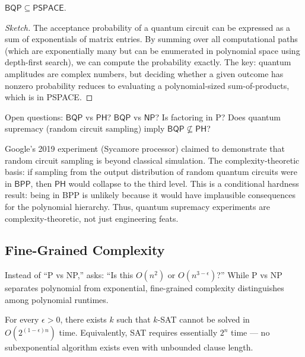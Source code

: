 \begin{theorem}
$\mathsf{BQP} \subseteq \mathsf{PSPACE}$.
\end{theorem}

\begin{proof}[Sketch]
The acceptance probability of a quantum circuit can be expressed as a sum of exponentials of matrix entries. By summing over all computational paths (which are exponentially many but can be enumerated in polynomial space using depth-first search), we can compute the probability exactly. The key: quantum amplitudes are complex numbers, but deciding whether a given outcome has nonzero probability reduces to evaluating a polynomial-sized sum-of-products, which is in PSPACE.
\end{proof}

Open questions: $\mathsf{BQP}$ vs $\mathsf{PH}$? $\mathsf{BQP}$ vs $\mathsf{NP}$? Is factoring in P? Does quantum supremacy (random circuit sampling) imply $\mathsf{BQP} \not\subseteq \mathsf{PH}$?

Google's 2019 experiment (Sycamore processor) claimed to demonstrate that random circuit sampling is beyond classical simulation. The complexity-theoretic basis: if sampling from the output distribution of random quantum circuits were in $\mathsf{BPP}$, then $\mathsf{PH}$ would collapse to the third level. This is a conditional hardness result: being in BPP is unlikely because it would have implausible consequences for the polynomial hierarchy. Thus, quantum supremacy experiments are complexity-theoretic, not just engineering feats.

\subsection{Fine-Grained Complexity}
\label{sec:complexity:fine}

Instead of ``P vs NP,'' asks: ``Is this $O(n^2)$ or $O(n^{3-\epsilon})$?'' While P vs NP separates polynomial from exponential, fine-grained complexity distinguishes among polynomial runtimes.

\begin{definition}
For every $\epsilon > 0$, there exists $k$ such that $k$-SAT cannot be solved in $O(2^{(1-\epsilon)n})$ time. Equivalently, SAT requires essentially $2^n$ time — no subexponential algorithm exists even with unbounded clause length.
\end{definition}

